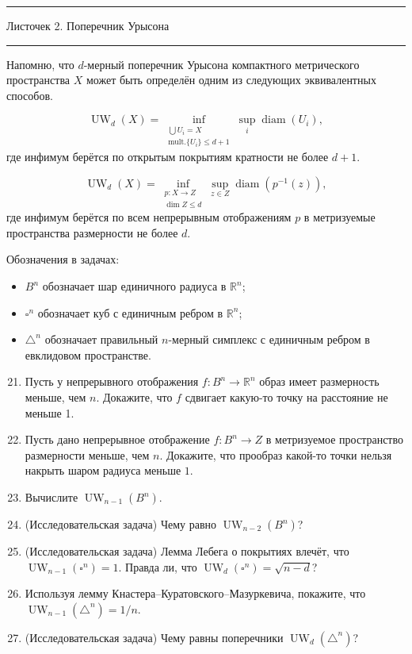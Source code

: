 \documentclass[12pt]{article}
\newcommand{\HRule}{\rule{\linewidth}{0.5mm}}
\renewcommand{\le}{\leqslant}
\DeclareMathOperator{\UW}{UW}
\DeclareMathOperator{\diam}{diam}
\begin{document}
{
\HRule
 \normalfont \Large \center
   Листочек 2. Поперечник Урысона

\HRule
}
Напомню, что $d$-мерный поперечник Урысона компактного метрического пространства $X$ может быть определён одним из следующих эквивалентных способов.

\[
\UW_d(X) = \inf\limits_{\substack{\bigcup U_i = X \\ \text{mult.} \{U_i\} \le d+1}} \sup\limits_{i} \diam(U_i),
\]
где инфимум берётся по открытым покрытиям кратности не более $d+1$.

\[
\UW_d(X) = \inf\limits_{\substack{p: X \to Z \\ \dim Z \le d}} \sup\limits_{z \in Z} \diam(p^{-1}(z)),
\]
где инфимум берётся по всем непрерывным отображениям $p$ в метризуемые пространства размерности не более $d$.

Обозначения в задачах:
\begin{itemize}
  \item $B^n$ обозначает шар единичного радиуса в $\mathbb{R}^n$;
  \item $\square^n$ обозначает куб с единичным ребром в $\mathbb{R}^n$;
  \item $\triangle^n$ обозначает правильный $n$-мерный симплекс с единичным ребром в евклидовом пространстве.
\end{itemize} 

\begin{enumerate}
\setcounter{enumi}{20}

\item Пусть у непрерывного отображения $f: B^n \to \mathbb{R}^n$ образ имеет размерность меньше, чем $n$. Докажите, что $f$ сдвигает какую-то точку на расстояние не меньше 1.

\item Пусть дано непрерывное отображение $f: B^n \to Z$ в метризуемое пространство размерности меньше, чем $n$. Докажите, что прообраз какой-то точки нельзя накрыть шаром радиуса меньше $1$.

\item Вычислите $\UW_{n-1}(B^n)$.

\item (Исследовательская задача) Чему равно $\UW_{n-2}(B^n)$?

\item (Исследовательская задача) Лемма Лебега о покрытиях влечёт, что $\UW_{n-1}(\square^n) = 1$. Правда ли, что $\UW_{d}(\square^n) = \sqrt{n-d}$?
    
\item Используя лемму Кнастера--Куратовского--Мазуркевича, покажите, что $\UW_{n-1}(\triangle^n) = 1/n$. 

\item (Исследовательская задача) Чему равны поперечники $\UW_{d}(\triangle^n)$?


\end{enumerate}
\end{document}
